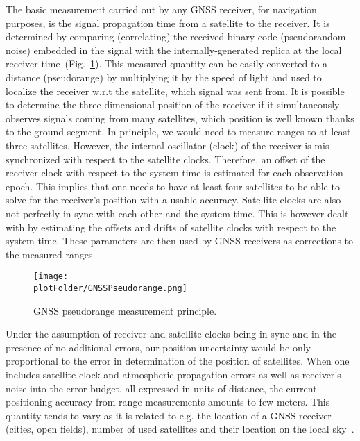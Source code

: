 The basic measurement carried out by any GNSS receiver, for navigation purposes, is the signal propagation time from a satellite
to the receiver. It is determined by comparing (correlating) the received binary code (pseudorandom noise) 
embedded in the signal with the internally-generated replica at the local receiver time~(Fig.~\ref{fig:PseudorangeMeasurements}). 
This measured quantity can be easily converted to a distance (pseudorange) by multiplying it by the speed of light and used to localize the 
receiver w.r.t the satellite, which signal was sent from. 
It is possible to determine the three-dimensional position of the receiver if it simultaneously observes signals 
coming from many satellites, which position is well known thanks to the ground segment. In principle, we would need to measure ranges to at least three satellites.
However, the internal oscillator (clock) of the receiver is mis-synchronized with respect to the satellite clocks.
Therefore, an offset of the receiver clock with respect to the system time is estimated for each observation epoch. This 
implies that one needs to have at least four satellites to be able to solve for the receiver's position with a usable accuracy. 
Satellite clocks are also not perfectly in sync with each other and the system time. This is however dealt with by estimating 
the offsets and drifts of satellite clocks with respect to the system time. These parameters are then used by GNSS receivers 
as corrections to the measured ranges. \par{}

\begin{figure}[ht]
  \begin{center}
\texttt{[image: \\plotFolder/GNSSPseudorange.png]}
\caption{GNSS pseudorange measurement principle.} 
    \label{fig:PseudorangeMeasurements}
  \end{center}
\end{figure} 

Under the assumption of receiver and satellite clocks being in sync and in the presence of no additional errors, our position uncertainty would be 
only proportional to the error in determination of the position of satellites. When one includes satellite clock
and atmospheric propagation errors as well as receiver's noise into the error budget, all
expressed in units of distance, the current positioning accuracy from range measurements amounts to few meters. This 
quantity tends to vary as it is related to e.g. the location of a GNSS receiver (cities, open fields), number of used satellites and their location on the 
local sky~\citep{Teunissen:2017}.